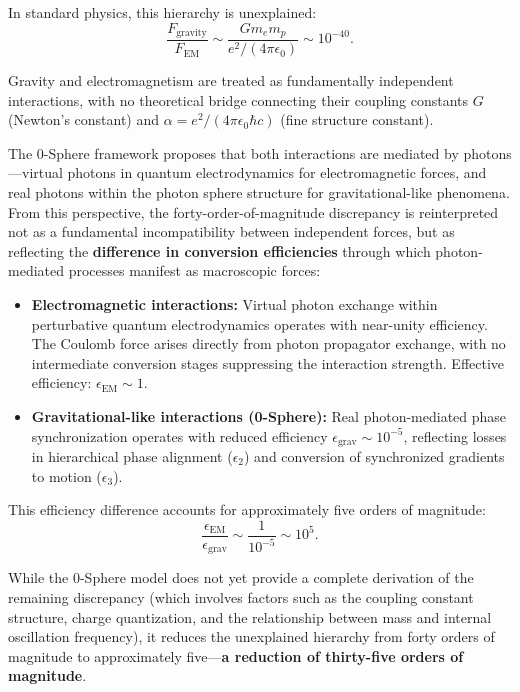\documentclass[12pt,letterpaper]{article}
\begin{document}
In standard physics, this hierarchy is unexplained:
\begin{equation}
\frac{F_{\text{gravity}}}{F_{\text{EM}}} \sim \frac{Gm_e m_p}{e^2/(4\pi\epsilon_0)} \sim 10^{-40}.
\end{equation}

Gravity and electromagnetism are treated as fundamentally independent interactions, with no theoretical bridge connecting their coupling constants $G$ (Newton's constant) and $\alpha = e^2/(4\pi\epsilon_0\hbar c)$ (fine structure constant).

The 0-Sphere framework proposes that both interactions are mediated by photons—virtual photons in quantum electrodynamics for electromagnetic forces, and real photons within the photon sphere structure for gravitational-like phenomena. From this perspective, the forty-order-of-magnitude discrepancy is reinterpreted not as a fundamental incompatibility between independent forces, but as reflecting the \textbf{difference in conversion efficiencies} through which photon-mediated processes manifest as macroscopic forces:

\begin{itemize}
\item \textbf{Electromagnetic interactions:} Virtual photon exchange within perturbative quantum electrodynamics operates with near-unity efficiency. The Coulomb force arises directly from photon propagator exchange, with no intermediate conversion stages suppressing the interaction strength. Effective efficiency: $\epsilon_{\text{EM}} \sim 1$.

\item \textbf{Gravitational-like interactions (0-Sphere):} Real photon-mediated phase synchronization operates with reduced efficiency $\epsilon_{\text{grav}} \sim 10^{-5}$, reflecting losses in hierarchical phase alignment ($\epsilon_2$) and conversion of synchronized gradients to motion ($\epsilon_3$).
\end{itemize}

This efficiency difference accounts for approximately five orders of magnitude:
\begin{equation}
\frac{\epsilon_{\text{EM}}}{\epsilon_{\text{grav}}} \sim \frac{1}{10^{-5}} \sim 10^{5}.
\end{equation}

While the 0-Sphere model does not yet provide a complete derivation of the remaining discrepancy (which involves factors such as the coupling constant structure, charge quantization, and the relationship between mass and internal oscillation frequency), it reduces the unexplained hierarchy from forty orders of magnitude to approximately five—\textbf{a reduction of thirty-five orders of magnitude}.
\end{document}
